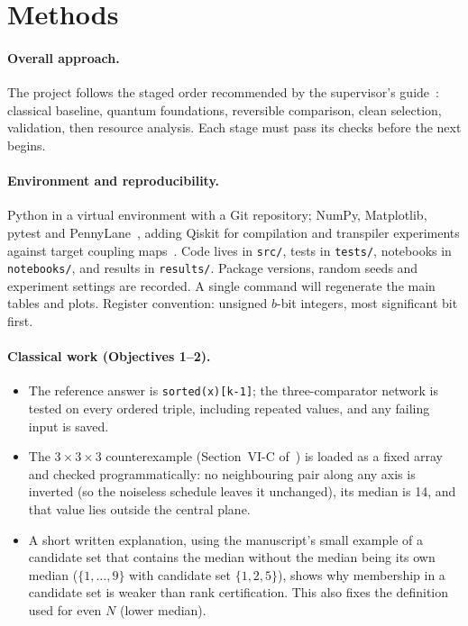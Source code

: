 \documentclass[11pt,a4paper]{article}
\begin{document}
\section{Methods}

\paragraph{Overall approach.}
The project follows the staged order recommended by the supervisor's guide~\cite{guide}: classical baseline, quantum foundations, reversible comparison, clean selection, validation, then resource analysis. Each stage must pass its checks before the next begins.

\paragraph{Environment and reproducibility.}
Python in a virtual environment with a Git repository; NumPy, Matplotlib, pytest and PennyLane~\cite{pennylane}, adding Qiskit for compilation and transpiler experiments against target coupling maps~\cite{ibm}. Code lives in \texttt{src/}, tests in \texttt{tests/}, notebooks in \texttt{notebooks/}, and results in \texttt{results/}. Package versions, random seeds and experiment settings are recorded. A single command will regenerate the main tables and plots. Register convention: unsigned $b$-bit integers, most significant bit first.

\paragraph{Classical work (Objectives 1--2).}
\begin{itemize}
  \item The reference answer is \texttt{sorted(x)[k-1]}; the three-comparator network is tested on every ordered triple, including repeated values, and any failing input is saved.
  \item The $3\times3\times3$ counterexample (Section~VI-C of~\cite{jiang}) is loaded as a fixed array and checked programmatically: no neighbouring pair along any axis is inverted (so the noiseless schedule leaves it unchanged), its median is 14, and that value lies outside the central plane.
  \item A short written explanation, using the manuscript's small example of a candidate set that contains the median without the median being its own median ($\{1,\dots,9\}$ with candidate set $\{1,2,5\}$), shows why membership in a candidate set is weaker than rank certification. This also fixes the definition used for even $N$ (lower median).
\end{itemize}
\end{document}
